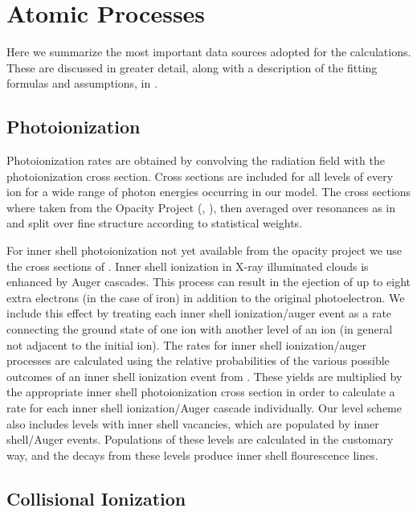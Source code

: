 \section{Atomic Processes}

Here we summarize the most important data sources adopted for the 
calculations.  These are discussed in greater detail, along with 
a description of the fitting formulas and assumptions, in 
\cite{bautista2000}.

\subsection{Photoionization}

Photoionization rates are
obtained by convolving the radiation field with the photoionization
cross  section.  Cross sections are included for all levels of every 
ion for a 
wide range of photon  energies occurring in our model. 
The cross sections where taken from the Opacity Project (\cite{opacityp},
\cite{topbase}), then averaged over resonances as in
\cite{bautista1997} and split over fine structure according to
statistical weights.  

For inner shell photoionization not yet available from the 
opacity project we use the cross sections of 
\cite{Verner1995}.  Inner shell ionization in X-ray illuminated clouds
is enhanced by Auger cascades.  This process can result in the ejection of up to eight
extra  electrons (in the case of iron) in addition to the original
photoelectron.  We include this effect by treating each inner shell ionization/auger event
as a rate connecting the ground state of one ion with another level
of an ion (in general not adjacent to the initial ion).  The rates for 
inner shell ionization/auger processes are calculated using the relative 
probabilities of the various possible outcomes of 
an inner shell ionization event from \cite{Kaastra1989}.  These yields are 
multiplied by the appropriate inner shell photoionization cross section 
in order to calculate a rate for each inner shell ionization/Auger cascade 
individually.  Our level 
scheme also includes levels with inner shell vacancies, which are populated 
by inner shell/Auger events.  Populations of these levels are calculated 
in the customary way, and the decays from these levels produce inner shell 
flourescence lines.

\subsection{Collisional Ionization}

